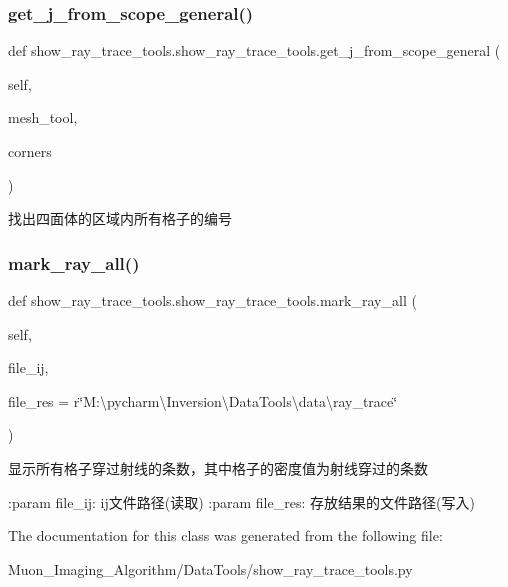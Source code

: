 \subsubsection{\texorpdfstring{get\+\_\+j\+\_\+from\+\_\+scope\+\_\+general()}{get\_j\_from\_scope\_general()}}
{\footnotesize\ttfamily def show\+\_\+ray\+\_\+trace\+\_\+tools.\+show\+\_\+ray\+\_\+trace\+\_\+tools.\+get\+\_\+j\+\_\+from\+\_\+scope\+\_\+general (\begin{DoxyParamCaption}\item[{}]{self,  }\item[{}]{mesh\+\_\+tool,  }\item[{}]{corners }\end{DoxyParamCaption})}

\begin{DoxyVerb}找出四面体的区域内所有格子的编号\end{DoxyVerb}
 \mbox{\label{classshow__ray__trace__tools_1_1show__ray__trace__tools_af9976c0c593720aaadb04a0caf6b05ed}} 
\subsubsection{\texorpdfstring{mark\+\_\+ray\+\_\+all()}{mark\_ray\_all()}}
{\footnotesize\ttfamily def show\+\_\+ray\+\_\+trace\+\_\+tools.\+show\+\_\+ray\+\_\+trace\+\_\+tools.\+mark\+\_\+ray\+\_\+all (\begin{DoxyParamCaption}\item[{}]{self,  }\item[{}]{file\+\_\+ij,  }\item[{}]{file\+\_\+res = {\ttfamily r\char`\"{}M\+:\textbackslash{}pycharm\textbackslash{}Inversion\textbackslash{}DataTools\textbackslash{}data\textbackslash{}ray\+\_\+trace\char`\"{}} }\end{DoxyParamCaption})}

\begin{DoxyVerb}显示所有格子穿过射线的条数，其中格子的密度值为射线穿过的条数

:param file_ij: ij文件路径(读取)
:param file_res: 存放结果的文件路径(写入)
\end{DoxyVerb}
 

The documentation for this class was generated from the following file\+:\begin{DoxyCompactItemize}
\item 
Muon\+\_\+\+Imaging\+\_\+\+Algorithm/\+Data\+Tools/show\+\_\+ray\+\_\+trace\+\_\+tools.\+py\end{DoxyCompactItemize}
